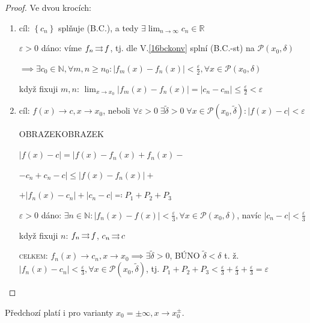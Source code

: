 \begin{proof}
    Ve dvou krocích:
    \begin{enumerate}[1. \textsc{krok}]
        \item cíl: $\left\{c_n\right\}$ splňuje (B.C.), a tedy $\exists \lim_{n\to\infty} c_n \in \mathbb R$

            $\varepsilon>0$ dáno: víme $f_n \operatorname{\rightrightarrows} f$, tj. dle V.\ref{16bckonv} splní (B.C.-st) na $\mathscr P(x_0, \delta)$

            $\implies \exists c_0 \in \mathbb N, \forall m, n \geq n_0\colon\left|f_m(x)-f_n(x)\right|<\frac{\varepsilon}{2}, \forall x \in \mathscr P(x_0, \delta)$

            když fixuji $m,n$: $\lim_{x \to x_0} \left|f_m(x)-f_n(x)\right|=\left|c_n-c_m\right|\leq \frac{\varepsilon}{2}<\varepsilon$
        \item cíl: $f(x)\to c, x \to x_0$, neboli $\forall \varepsilon>0\;\exists \tilde \delta>0 \; \forall x \in \mathscr P(x_0, \tilde \delta)\colon\left|f(x)-c\right|<\varepsilon$
            \begin{minipage}{0.58\textwidth}
                OBRAZEKOBRAZEK
            \end{minipage}\begin{minipage}{0.42\textwidth}
                $\left|f(x)-c\right|=\left|f(x)-f_n(x)+f_n(x)-\right.$

                $\left.-c_n+c_n-c\right|\leq\left|f(x)-f_n(x)\right|+$

                $+\left|f_n(x)-c_n\right|+\left|c_n-c\right|\eqcolon P_1 + P_2 + P_3$
            \end{minipage}
            $\varepsilon>0$ dáno: $\exists n \in \mathbb N\colon\left|f_n(x)-f(x)\right|<\frac{\varepsilon}{3}, \forall x \in \mathscr P(x_0, \delta)$, navíc $\left|c_n-c\right|<\frac{\varepsilon}{3}$

            když fixuji $n$: $f_n \operatorname{\rightrightarrows} f$, $c_n \operatorname{\rightrightarrows} c$

            \textsc{celkem}: $f_n(x)\to c_n, x \to x_0\implies\exists \tilde \delta>0$, BÚNO $\tilde \delta<\delta$ t. ž. $\left|f_n(x)-c_n\right|<\frac{\varepsilon}{3}, \forall x \in \mathscr P (x_0, \tilde \delta)$, tj. $P_1+P_2+P_3<\frac{\varepsilon}{3}+\frac{\varepsilon}{3}+ \frac{\varepsilon}{3}=\varepsilon$\qedhere
    \end{enumerate}
\end{proof}

\begin{poznamka}
    Předchozí platí i pro varianty $x_0=\pm\infty, x \to x_0^\pm$.
\end{poznamka}

